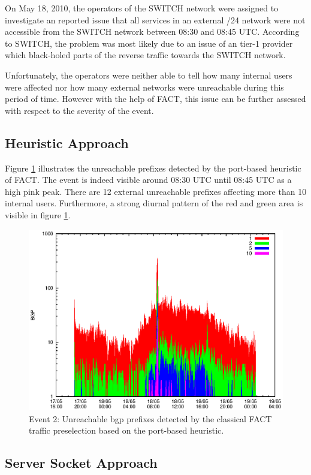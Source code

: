 On May 18, 2010, the operators of the SWITCH network were assigned to 
investigate an reported issue that all services in an external /24 network were 
not accessible from the SWITCH network between 08:30 and 08:45 UTC. According to 
SWITCH, the problem was most likely due to an issue of an tier-1 provider which 
black-holed parts of the reverse traffic towards the SWITCH 
network\citep{SchatzmannPAM2011}.

Unfortunately, the operators were neither able to tell how many internal users 
were affected nor how many external networks were unreachable during this period 
of time. However with the help of \gls{FACT}, this issue can be further assessed 
with respect to the severity of the event\citep{SchatzmannPAM2011}.

\subsection{Heuristic Approach}

Figure \ref{fig:TIER1_FACT_REF} illustrates the unreachable prefixes detected by 
the port-based heuristic of \gls{FACT}. The event is indeed visible around 08:30 
UTC until 08:45 UTC as a high pink peak. There are 12 external unreachable 
prefixes affecting more than 10 internal users. Furthermore, a strong diurnal 
pattern of the red and green area is visible in figure \ref{fig:TIER1_FACT_REF}. 

\begin{figure}
	[p] \centering 
	\includegraphics[width=0.75\linewidth]{images/events/2010_05_18/bgp_log_port80_ref.eps} \caption{Event 2: Unreachable \gls{bgp} prefixes detected by the classical \gls{FACT} traffic preselection based on the port-based heuristic.} 
	\label{fig:TIER1_FACT_REF} 
\end{figure}

\subsection{Server Socket Approach}

